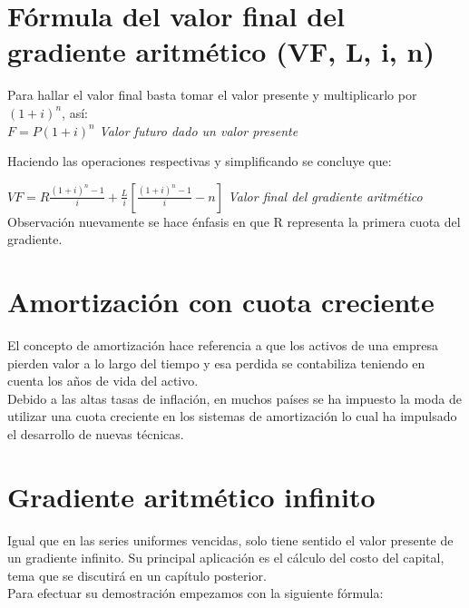 	\section{Fórmula del valor final del gradiente aritmético (VF, L, i, n)}
	
	Para hallar el valor final basta tomar el valor presente y multiplicarlo por $(1+i)^n$, así:\\
$F= P(1+i)^n$ \hspace{120pt} \textit{Valor futuro dado un valor presente}
	
	\vspace{2mm}
	Haciendo las operaciones respectivas y simplificando se concluye que:
	
$VF = R\frac{(1+i)^n-1}{i} + \frac{L}{i}[\frac{(1+i)^n-1}{i}-n]$ \hspace{35pt} \textit{Valor final del gradiente aritmético}\\
	
	\textrm{Observación} nuevamente se hace énfasis en que R representa la primera cuota del gradiente.\\
	

		      
		      \section{Amortización con cuota creciente}
		      
		      El concepto de amortización hace referencia a que los activos de una empresa pierden valor a lo largo del tiempo y esa perdida se contabiliza teniendo en cuenta los años de vida del activo. \\
		      
		      Debido a las altas tasas de inflación, en muchos países se ha impuesto la moda de utilizar una cuota creciente en los sistemas de amortización lo cual ha impulsado el desarrollo de nuevas técnicas.\\
		      


	\section{Gradiente aritmético infinito}
	Igual que en las series uniformes vencidas, solo tiene sentido el valor presente de un gradiente 	infinito. Su principal aplicación es el cálculo del costo del capital, tema que se discutirá en un capítulo posterior.\\
	Para efectuar su demostración empezamos con la siguiente fórmula: \\
	
